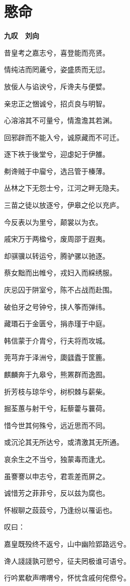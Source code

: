 \documentclass[12pt,a4paper]{ctexbook}
\begin{document}
\section{愍命}
\textbf{九叹　刘向}\par\vspace{0.5em}
昔皇考之嘉志兮，喜登能而亮贤。\par
情纯洁而罔薉兮，姿盛质而无愆。\par
放佞人与谄谀兮，斥谗夫与便嬖。\par
亲忠正之悃诚兮，招贞良与明智。\par
心溶溶其不可量兮，情澹澹其若渊。\par
回邪辟而不能入兮，诚原藏而不可迁。\par
逐下袟于後堂兮，迎虙妃于伊雒。\par
刜谗贼于中廇兮，选吕管于榛薄。\par
丛林之下无怨士兮，江河之畔无隐夫。\par
三苗之徒以放逐兮，伊皋之伦以充庐。\par
今反表以为里兮，颠裳以为衣。\par
戚宋万于两楹兮，废周邵于遐夷。\par
却骐骥以转运兮，腾驴骡以驰逐。\par
蔡女黜而出帷兮，戎妇入而綵绣服。\par
庆忌囚于阱室兮，陈不占战而赴围。\par
破伯牙之号钟兮，挟人筝而弹纬。\par
藏瑉石于金匮兮，捐赤瑾于中庭。\par
韩信蒙于介胄兮，行夫将而攻城。\par
莞芎弃于泽洲兮，瓟瓥蠹于筐簏。\par
麒麟奔于九皋兮，熊罴群而逸囿。\par
折芳枝与琼华兮，树枳棘与薪柴。\par
掘荃蕙与射干兮，耘藜藿与蘘荷。\par
惜今世其何殊兮，远近思而不同。\par
或沉沦其无所达兮，或清激其无所通。\par
哀余生之不当兮，独蒙毒而逢尤。\par
虽謇謇以申志兮，君乖差而屏之。\par
诚惜芳之菲菲兮，反以兹为腐也。\par
怀椒聊之蔎蔎兮，乃逢纷以罹诟也。\par
叹曰：\par
嘉皇既殁终不返兮，山中幽险郢路远兮。\par
谗人諓諓孰可愬兮，征夫罔极谁可语兮。\par
行吟累欷声喟喟兮，怀忧含戚何侘傺兮。\par
\end{document}
